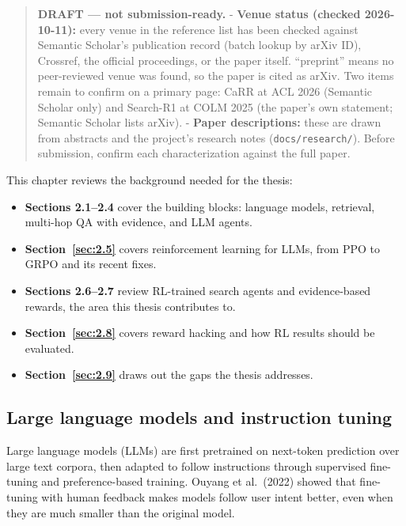 
\begin{quote}
\textbf{DRAFT --- not submission-ready.} - \textbf{Venue status (checked
2026-10-11):} every venue in the reference list has been checked against
Semantic Scholar's publication record (batch lookup by arXiv ID),
Crossref, the official proceedings, or the paper itself. ``preprint''
means no peer-reviewed venue was found, so the paper is cited as arXiv.
Two items remain to confirm on a primary page: CaRR at ACL 2026
(Semantic Scholar only) and Search-R1 at COLM 2025 (the paper's own
statement; Semantic Scholar lists arXiv). - \textbf{Paper descriptions:}
these are drawn from abstracts and the project's research notes
(\texttt{docs/\allowbreak{}research/\allowbreak{}}). Before submission,
confirm each characterization against the full paper.
\end{quote}

This chapter reviews the background needed for the thesis:

\begin{itemize}
\tightlist
\item
  \textbf{Sections 2.1--2.4} cover the building blocks: language models,
  retrieval, multi-hop QA with evidence, and LLM agents.
\item
  \textbf{Section~\ref{sec:2.5}} covers reinforcement learning for LLMs,
  from PPO to GRPO and its recent fixes.
\item
  \textbf{Sections 2.6--2.7} review RL-trained search agents and
  evidence-based rewards, the area this thesis contributes to.
\item
  \textbf{Section~\ref{sec:2.8}} covers reward hacking and how RL
  results should be evaluated.
\item
  \textbf{Section~\ref{sec:2.9}} draws out the gaps the thesis
  addresses.
\end{itemize}

\subsection{Large language models and instruction tuning}\label{sec:2.1}

Large language models (LLMs) are first pretrained on next-token
prediction over large text corpora, then adapted to follow instructions
through supervised fine-tuning and preference-based training. Ouyang et
al.~(2022) showed that fine-tuning with human feedback makes models
follow user intent better, even when they are much smaller than the
original model.

